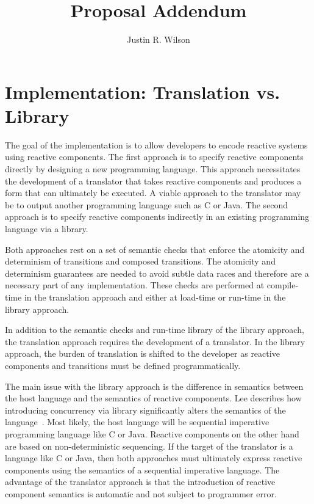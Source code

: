 \documentclass[letterpaper]{article}
\title{Proposal Addendum}
\author{Justin R. Wilson}
\date{}
\begin{document}
\maketitle

\section{Implementation:  Translation vs. Library}

The goal of the implementation is to allow developers to encode reactive systems using reactive components.
The first approach is to specify reactive components directly by designing a new programming language.
This approach necessitates the development of a translator that takes reactive components and produces a form that can ultimately be executed.
A viable approach to the translator may be to output another programming language such as C or Java.
The second approach is to specify reactive components indirectly in an existing programming language via a library.

Both approaches rest on a set of semantic checks that enforce the atomicity and determinism of transitions and composed transitions.
The atomicity and determinism guarantees are needed to avoid subtle data races and therefore are a necessary part of any implementation.
These checks are performed at compile-time in the translation approach and either at load-time or run-time in the library approach.

In addition to the semantic checks and run-time library of the library approach, the translation approach requires the development of a translator.
In the library approach, the burden of translation is shifted to the developer as reactive components and transitions must be defined programmatically.

The main issue with the library approach is the difference in semantics between the host language and the semantics of reactive components.
Lee describes how introducing concurrency via library significantly alters the semantics of the language~\cite{lee2006problem}.
Most likely, the host language will be sequential imperative programming language like C or Java.
Reactive components on the other hand are based on non-deterministic sequencing.
If the target of the translator is a language like C or Java, then both approaches must ultimately express reactive components using the semantics of a sequential imperative language.
The advantage of the translator approach is that the introduction of reactive component semantics is automatic and not subject to programmer error.
\end{document}
